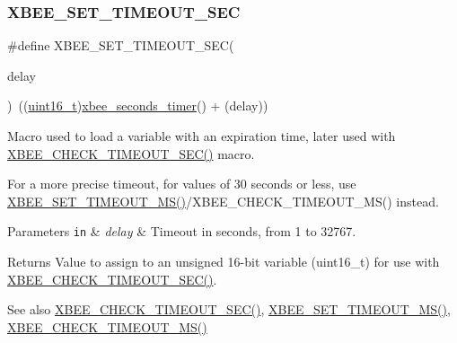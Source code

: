 \subsubsection{\texorpdfstring{X\+B\+E\+E\+\_\+\+S\+E\+T\+\_\+\+T\+I\+M\+E\+O\+U\+T\+\_\+\+S\+EC}{XBEE\_SET\_TIMEOUT\_SEC}}
{\footnotesize\ttfamily \#define X\+B\+E\+E\+\_\+\+S\+E\+T\+\_\+\+T\+I\+M\+E\+O\+U\+T\+\_\+\+S\+EC(\begin{DoxyParamCaption}\item[{}]{delay }\end{DoxyParamCaption})~((\hyperlink{group__hal__dos_ga5a8b2dc9e45a9ee81a94ef304fb62505}{uint16\+\_\+t})\hyperlink{group__hal_ga5c1a8bccd41acf1d7264a75698077749}{xbee\+\_\+seconds\+\_\+timer}() + (delay))}



Macro used to load a variable with an expiration time, later used with \hyperlink{group__hal_ga858c3c1caa899efd6af9ee8a0fe09246}{X\+B\+E\+E\+\_\+\+C\+H\+E\+C\+K\+\_\+\+T\+I\+M\+E\+O\+U\+T\+\_\+\+S\+E\+C()} macro. 

For a more precise timeout, for values of 30 seconds or less, use \hyperlink{group__hal_ga848a9903fa7859d84cb22aeddde4c42f}{X\+B\+E\+E\+\_\+\+S\+E\+T\+\_\+\+T\+I\+M\+E\+O\+U\+T\+\_\+\+M\+S()}/\+X\+B\+E\+E\+\_\+\+C\+H\+E\+C\+K\+\_\+\+T\+I\+M\+E\+O\+U\+T\+\_\+\+MS() instead.


\begin{DoxyParams}[1]{Parameters}
\mbox{\tt in}  & {\em delay} & Timeout in seconds, from 1 to 32767.\\
\hline
\end{DoxyParams}
\begin{DoxyReturn}{Returns}
Value to assign to an unsigned 16-\/bit variable (uint16\+\_\+t) for use with \hyperlink{group__hal_ga858c3c1caa899efd6af9ee8a0fe09246}{X\+B\+E\+E\+\_\+\+C\+H\+E\+C\+K\+\_\+\+T\+I\+M\+E\+O\+U\+T\+\_\+\+S\+E\+C()}.
\end{DoxyReturn}
\begin{DoxySeeAlso}{See also}
\hyperlink{group__hal_ga858c3c1caa899efd6af9ee8a0fe09246}{X\+B\+E\+E\+\_\+\+C\+H\+E\+C\+K\+\_\+\+T\+I\+M\+E\+O\+U\+T\+\_\+\+S\+E\+C()}, \hyperlink{group__hal_ga848a9903fa7859d84cb22aeddde4c42f}{X\+B\+E\+E\+\_\+\+S\+E\+T\+\_\+\+T\+I\+M\+E\+O\+U\+T\+\_\+\+M\+S()}, \hyperlink{group__hal_gac3485c3c34a50a5a35d553cc743d163e}{X\+B\+E\+E\+\_\+\+C\+H\+E\+C\+K\+\_\+\+T\+I\+M\+E\+O\+U\+T\+\_\+\+M\+S()}
\end{DoxySeeAlso}

